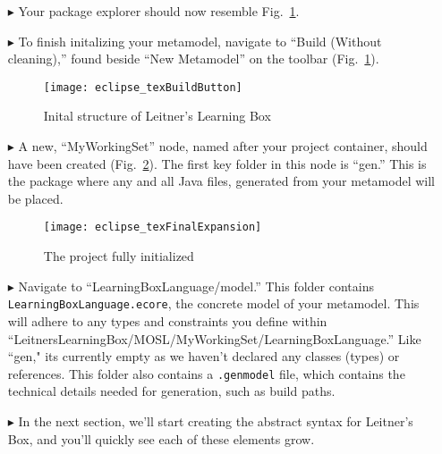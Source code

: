 \begin{itemize}
\item[$\blacktriangleright$] Your package explorer should now resemble Fig.~\ref{fig:preBuild}.

\item[$\blacktriangleright$] To finish initalizing your metamodel, navigate to ``Build (Without cleaning),'' found beside ``New Metamodel'' on the
toolbar (Fig.~\ref{fig:preBuild}).

\vspace{0.25cm}

\begin{figure}[htbp]
	\centering
  \texttt{[image: eclipse\_texBuildButton]}
	\caption{Inital structure of Leitner's Learning Box}
	\label{fig:preBuild}
\end{figure} 

\vspace{0.25cm}

\item[$\blacktriangleright$] A new, ``MyWorkingSet'' node, named after your project container, should have been created (Fig.~\ref{fig:finalFiles}). The
first key folder in this node is ``gen.'' This is the package where any and all Java files, generated from your metamodel will be placed.

\newpage

\begin{figure}[htbp]
	\centering
  \texttt{[image: eclipse\_texFinalExpansion]}
	\caption{The project fully initialized}
	\label{fig:finalFiles}
\end{figure} 

\vspace{0.5cm}

\item[$\blacktriangleright$] Navigate to ``LearningBoxLanguage/model.'' This folder contains \\ \texttt{LearningBoxLanguage.ecore}, the concrete model of
your metamodel. This will adhere to any types and constraints you define within ``LeitnersLearningBox/MOSL/MyWorkingSet/LearningBoxLanguage.'' Like ``gen,"
its currently empty as we haven't declared any classes (types) or references. This folder also contains a \texttt{.genmodel} file, which contains the technical
details needed for generation, such as build paths.

\vspace{0.5cm}

\item[$\blacktriangleright$] In the next section, we'll start creating the abstract syntax for Leitner's Box, and you'll quickly see each of these elements
grow.


\end{itemize}
